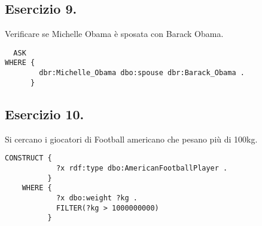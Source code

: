 \documentclass[11pt]{article}
\begin{document}
\subsection*{Esercizio 9.}
Verificare se Michelle Obama è sposata con Barack Obama.
\begin{verbatim}
  ASK
WHERE {
        dbr:Michelle_Obama dbo:spouse dbr:Barack_Obama .
      }
\end{verbatim}

\subsection*{Esercizio 10.}
Si cercano i giocatori di Football americano che pesano più di 100kg.
\begin{verbatim}
CONSTRUCT {
            ?x rdf:type dbo:AmericanFootballPlayer .
          }
    WHERE {
            ?x dbo:weight ?kg .
            FILTER(?kg > 1000000000)
          }
\end{verbatim}
\end{document}
